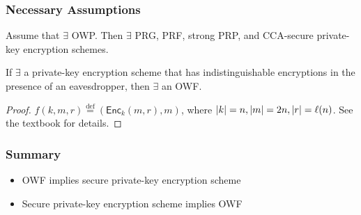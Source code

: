 \begin{frame}\frametitle{Necessary Assumptions}
\begin{theorem}
Assume that $\exists$ OWP. Then $\exists$ PRG, PRF, strong PRP, and CCA-secure private-key encryption schemes.
\end{theorem}
\begin{proposition}
If $\exists$ a private-key encryption scheme that has indistinguishable encryptions in the presence of an eavesdropper, then $\exists$ an OWF.
\end{proposition}
\begin{proof}
$f(k,m,r) \overset{\text{def}}{=} (\mathsf{Enc}_k(m,r),m)$, where $\lvert k\rvert=n, \lvert m\rvert=2n, \lvert r\rvert=\ell(n)$. See the textbook for details.
\end{proof}
\end{frame}
\begin{frame}\frametitle{Summary}
\begin{itemize}
\item OWF implies secure private-key encryption scheme
\item Secure private-key encryption scheme implies OWF
\end{itemize}
\end{frame}

